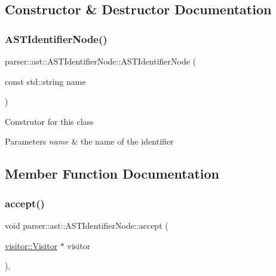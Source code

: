 \subsection{Constructor \& Destructor Documentation}
\mbox{\label{classparser_1_1ast_1_1ASTIdentifierNode_a14e111874a3d1a5181f9d889e12106e5}} 
\subsubsection{\texorpdfstring{A\+S\+T\+Identifier\+Node()}{ASTIdentifierNode()}}
{\footnotesize\ttfamily parser\+::ast\+::\+A\+S\+T\+Identifier\+Node\+::\+A\+S\+T\+Identifier\+Node (\begin{DoxyParamCaption}\item[{const std\+::string}]{name }\end{DoxyParamCaption})}

Construtor for this class 
\begin{DoxyParams}{Parameters}
{\em name} & the name of the identifier \\
\hline
\end{DoxyParams}


\subsection{Member Function Documentation}
\mbox{\label{classparser_1_1ast_1_1ASTIdentifierNode_a45633268cd67b109e9b9cc6d565e48f3}} 
\subsubsection{\texorpdfstring{accept()}{accept()}}
{\footnotesize\ttfamily void parser\+::ast\+::\+A\+S\+T\+Identifier\+Node\+::accept (\begin{DoxyParamCaption}\item[{\hyperlink{classvisitor_1_1Visitor}{visitor\+::\+Visitor} $\ast$}]{visitor }\end{DoxyParamCaption})\hspace{0.3cm}{\ttfamily [override]}, {\ttfamily [virtual]}}

